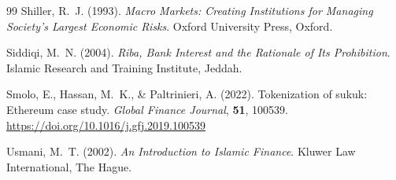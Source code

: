 \documentclass[10pt,twocolumn]{article}
\theoremstyle{plain}
\theoremstyle{definition}
\begin{document}
\begin{thebibliography}{99}
Shiller, R.~J. (1993).
\textit{Macro Markets: Creating Institutions for Managing
Society's Largest Economic Risks}.
Oxford University Press, Oxford.

Siddiqi, M.~N. (2004).
\textit{Riba, Bank Interest and the Rationale of Its Prohibition}.
Islamic Research and Training Institute, Jeddah.

Smolo, E., Hassan, M.~K., \& Paltrinieri, A. (2022).
Tokenization of sukuk: Ethereum case study.
\textit{Global Finance Journal}, \textbf{51}, 100539.
\url{https://doi.org/10.1016/j.gfj.2019.100539}

Usmani, M.~T. (2002).
\textit{An Introduction to Islamic Finance}.
Kluwer Law International, The Hague.

\end{thebibliography}
\end{document}

